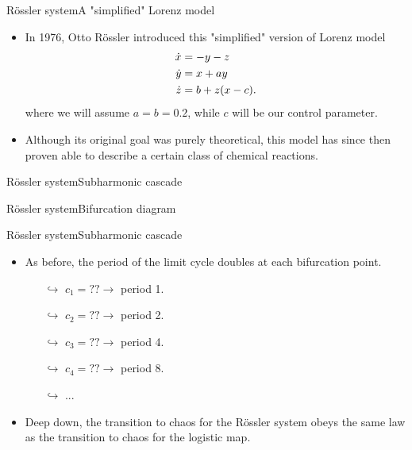\documentclass[usenames,dvipsnames,svgnames,10pt,aspectratio=169]{beamer}
\begin{document}
\begin{frame}[t, c]{R\"ossler system}{A "simplified" Lorenz model}
	\begin{itemize}
		\item In 1976, Otto R\"ossler introduced this "simplified" version of Lorenz model
		\begin{equation}
			\begin{aligned}
				\dot{x} & = -y -z \\
				\dot{y} & = x + a y \\
				\dot{z} & = b + z(x-c).
			\end{aligned}
			\notag
		\end{equation}
		where we will assume $a=b=0.2$, while $c$ will be our control parameter.

		\bigskip

		\item Although its original goal was purely theoretical, this model has since then proven able to describe a certain class of chemical reactions.
	\end{itemize}

	\vspace{1cm}
\end{frame}

\begin{frame}[t, c]{R\"ossler system}{Subharmonic cascade}

\end{frame}

\begin{frame}[t, c]{R\"ossler system}{Bifurcation diagram}

\end{frame}

\begin{frame}[t, c]{R\"ossler system}{Subharmonic cascade}
		\begin{itemize}
			\item As before, the period of the limit cycle doubles at each bifurcation point.
			\begin{itemize}
				\item[$\hookrightarrow$] $c_1 = ?? \to$ period 1.
				\item[$\hookrightarrow$] $c_2 = ?? \to$ period 2.
				\item[$\hookrightarrow$] $c_3 = ?? \to$ period 4.
				\item[$\hookrightarrow$] $c_4 = ?? \to$ period 8.
				\item[$\hookrightarrow$] ...
			\end{itemize}

			\bigskip

			\item Deep down, the transition to chaos for the R\"ossler system obeys the same law as the transition to chaos for the logistic map.
		\end{itemize}

		\vspace{1cm}
\end{frame}
\end{document}
